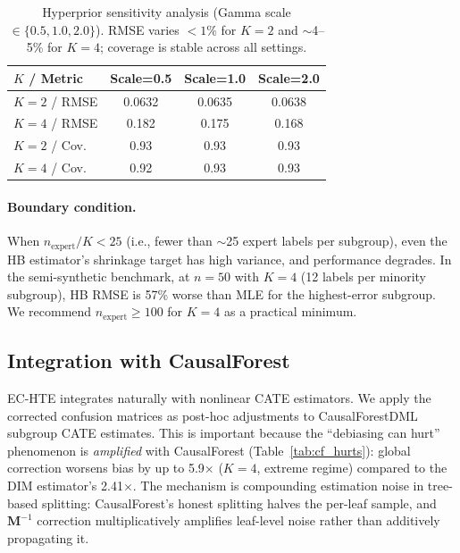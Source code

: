 \documentclass[11pt]{article}
\newcommand{\bM}{\mathbf{M}}
\begin{document}
\begin{table}[t]
\centering
\small
\begin{tabular}{lccc}
\toprule
$K$ / Metric & Scale=0.5 & Scale=1.0 & Scale=2.0 \\
\midrule
$K{=}2$ / RMSE & 0.0632 & 0.0635 & 0.0638 \\
$K{=}4$ / RMSE & 0.182 & 0.175 & 0.168 \\
$K{=}2$ / Cov. & 0.93 & 0.93 & 0.93 \\
$K{=}4$ / Cov. & 0.92 & 0.93 & 0.93 \\
\bottomrule
\end{tabular}
\caption{Hyperprior sensitivity analysis (Gamma scale $\in \{0.5, 1.0, 2.0\}$). RMSE varies $<1\%$ for $K{=}2$ and $\sim$4--5\% for $K{=}4$; coverage is stable across all settings.}
\label{tab:hyperprior}
\end{table}

\paragraph{Boundary condition.}
When $n_{\text{expert}} / K < 25$ (i.e., fewer than $\sim$25 expert labels per subgroup), even the HB estimator's shrinkage target has high variance, and performance degrades.
In the semi-synthetic benchmark, at $n{=}50$ with $K{=}4$ (12 labels per minority subgroup), HB RMSE is 57\% worse than MLE for the highest-error subgroup.
We recommend $n_{\text{expert}} \geq 100$ for $K{=}4$ as a practical minimum.

\subsection{Integration with CausalForest}
\label{sec:cf}

EC-HTE integrates naturally with nonlinear CATE estimators.
We apply the corrected confusion matrices as post-hoc adjustments to CausalForestDML \cite{athey2019generalized,chernozhukov2018double} subgroup CATE estimates.
This is important because the ``debiasing can hurt'' phenomenon is \emph{amplified} with CausalForest (Table~\ref{tab:cf_hurts}): global correction worsens bias by up to 5.9$\times$ ($K{=}4$, extreme regime) compared to the DIM estimator's 2.41$\times$.
The mechanism is compounding estimation noise in tree-based splitting: CausalForest's honest splitting halves the per-leaf sample, and $\bM^{-1}$ correction multiplicatively amplifies leaf-level noise rather than additively propagating it.
\end{document}

